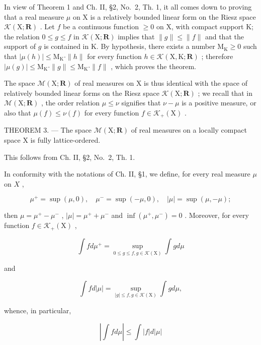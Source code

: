 In view of Theorem 1 and Ch. II, §2, No.~2, Th. 1, it all comes down to proving that a real measure \(\mu\) on X is a relatively bounded linear form on the Riesz space \(\mathcal{K}(\mathrm{X};\mathbf{R})\) . Let \(f\) be a continuous function \(\geqslant 0\) on X, with compact support K; the relation \(0 \leqslant g \leqslant f\) in \(\mathcal{K}(\mathrm{X};\mathbf{R})\) implies that \(\|g\| \leqslant \|f\|\) and that the support of \(g\) is contained in K. By hypothesis, there exists a number \(\mathrm{M}_{\mathrm{K}} \geqslant 0\) such that \(|\mu(h)| \leqslant \mathrm{M}_{\mathrm{K}} \cdot \|h\|\) for every function \(h \in \mathcal{K}(\mathrm{X},\mathrm{K};\mathbf{R})\) ; therefore \(|\mu(g)| \leqslant \mathrm{M}_{\mathrm{K}} \cdot \|g\| \leqslant \mathrm{M}_{\mathrm{K}} \cdot \|f\|\) , which proves the theorem.

The space \(\mathcal{M}(\mathrm{X};\mathbf{R})\) of real measures on X is thus identical with the space of relatively bounded linear forms on the Riesz space \(\mathcal{K}(\mathrm{X};\mathbf{R})\) ; we recall that in \(\mathcal{M}(\mathrm{X};\mathbf{R})\) , the order relation \(\mu\leqslant\nu\) signifies that \(\nu-\mu\) is a positive measure, or also that \(\mu(f)\leqslant\nu(f)\) for every function \(f\in\mathcal{K}_{+}(\mathrm{X})\) .

THEOREM 3. --- The space \(\mathcal{M}(\mathrm{X};\mathbf{R})\) of real measures on a locally compact space X is fully lattice-ordered.

This follows from Ch. II, §2, No.~2, Th. 1.

In conformity with the notations of Ch. II, §1, we define, for every real measure \(\mu\) on \(X\) ,

\[
\mu^ {+} = \sup (\mu , 0), \quad \mu^ {-} = \sup (- \mu , 0), \quad | \mu | = \sup (\mu , - \mu);
\]

then \(\mu = \mu^{+} - \mu^{-}\) , \(|\mu| = \mu^{+} + \mu^{-}\) and \(\inf (\mu^{+},\mu^{-}) = 0\) . Moreover, for every function \(f\in \mathcal{K}_{+}(\mathrm{X})\) ,

\[
\int f d \mu^ {+} = \sup _ {0 \leqslant g \leqslant f, g \in \mathcal {K} (\mathrm{X})} \int g d \mu\tag{8}
\]

and

\[
\int f d | \mu | = \sup _ {| g | \leqslant f, g \in \mathcal {K} (\mathrm{X})} \int g d \mu ,\tag{9}
\]

whence, in particular,

\[
\left| \int f d \mu \right| \leqslant \int | f | d | \mu |\tag{10}
\]

